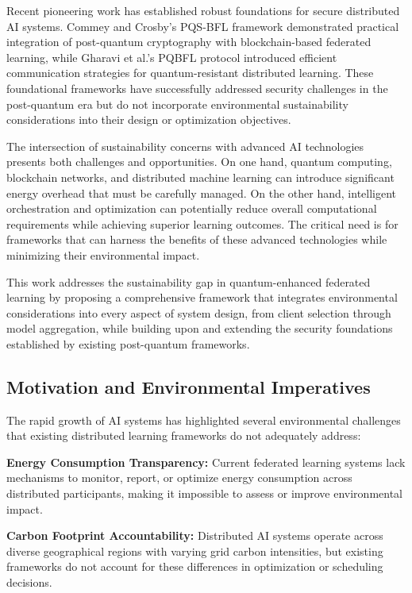 \documentclass[10pt,journal,compsoc]{IEEEtran}
\begin{document}
Recent pioneering work has established robust foundations for secure distributed AI systems. Commey and Crosby's PQS-BFL framework demonstrated practical integration of post-quantum cryptography with blockchain-based federated learning, while Gharavi et al.'s PQBFL protocol introduced efficient communication strategies for quantum-resistant distributed learning. These foundational frameworks have successfully addressed security challenges in the post-quantum era but do not incorporate environmental sustainability considerations into their design or optimization objectives.

The intersection of sustainability concerns with advanced AI technologies presents both challenges and opportunities. On one hand, quantum computing, blockchain networks, and distributed machine learning can introduce significant energy overhead that must be carefully managed. On the other hand, intelligent orchestration and optimization can potentially reduce overall computational requirements while achieving superior learning outcomes. The critical need is for frameworks that can harness the benefits of these advanced technologies while minimizing their environmental impact.

This work addresses the sustainability gap in quantum-enhanced federated learning by proposing a comprehensive framework that integrates environmental considerations into every aspect of system design, from client selection through model aggregation, while building upon and extending the security foundations established by existing post-quantum frameworks.

\subsection{Motivation and Environmental Imperatives}

The rapid growth of AI systems has highlighted several environmental challenges that existing distributed learning frameworks do not adequately address:

\textbf{Energy Consumption Transparency:} Current federated learning systems lack mechanisms to monitor, report, or optimize energy consumption across distributed participants, making it impossible to assess or improve environmental impact.

\textbf{Carbon Footprint Accountability:} Distributed AI systems operate across diverse geographical regions with varying grid carbon intensities, but existing frameworks do not account for these differences in optimization or scheduling decisions.
\end{document}
